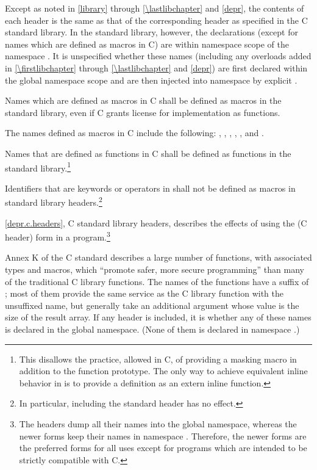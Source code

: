 \pnum
Except as noted in \ref{library} through \ref{\lastlibchapter}
and \ref{depr}, the contents of each header  is
the same as that of the corresponding header  as
specified in the C standard library.
In the \Cpp{} standard library, however, the
declarations (except for names which are defined as macros in C) are within
namespace scope of the namespace .
It is unspecified whether these names (including any overloads added in
\ref{\firstlibchapter} through \ref{\lastlibchapter} and \ref{depr})
are first declared within the global namespace scope
and are then injected into namespace  by explicit
.

\pnum
Names which are defined as macros in C shall be defined as macros in the \Cpp{}
standard library, even if C grants license for implementation as functions.
\begin{note} The names defined as macros in C include the following:
, , , ,
, and . \end{note}

\pnum
Names that are defined as functions in C shall be defined as functions in the
\Cpp{} standard library.\footnote{This disallows the practice, allowed in C, of
providing a masking macro in addition to the function prototype. The only way to
achieve equivalent inline behavior in \Cpp{} is to provide a definition as an
extern inline function.}

\pnum
Identifiers that are keywords or operators in \Cpp{} shall not be defined as
macros in \Cpp{} standard library headers.\footnote{In particular, including the
standard header  has no effect.}

\pnum
\ref{depr.c.headers}, C standard library headers, describes the effects of using
the  (C header) form in a \Cpp{} program.\footnote{ The
 headers dump all their names into the global namespace, whereas the
newer forms keep their names in namespace . Therefore, the newer
forms are the preferred forms for all uses except for \Cpp{} programs which are
intended to be strictly compatible with C. }

\pnum
Annex K of the C standard describes a large number of functions,
with associated types and macros,
which ``promote safer, more secure programming''
than many of the traditional C library functions.
The names of the functions have a suffix of ;
most of them provide the same service
as the C library function with the unsuffixed name,
but generally take an additional argument
whose value is the size of the result array.
If any \Cpp{} header is included,
it is 
whether any of these names
is declared in the global namespace.
(None of them is declared in namespace .)

